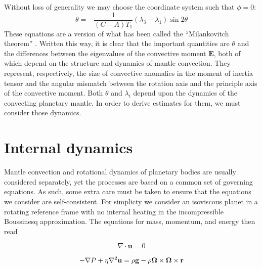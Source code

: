 \documentclass[extra,mreferee]{gji}
\begin{document}
Without loss of generality we may choose the coordinate system such that $\phi=0$:
\begin{equation}
\dot{\theta} = - \frac{1}{(C-A)T_1} (\lambda_3-\lambda_1) \sin{2 \theta}
\label{eq:simple_milankovitch}
\end{equation}
These equations are a version of what has been called the ``Milankovitch theorem'' \citep{munk1960rotation}.  
Written this way, it is clear that the important quantities are $\theta$ and the differences between the eigenvalues of the convective moment $\mathbf{E}$, both of which depend on the structure and dynamics of mantle convection.  
They represent, respectively, the size of convective anomalies in the moment of inertia tensor and the angular mismatch between the rotation axis and the principle axis of the convective moment.
Both $\theta$ and $\lambda_i$ depend upon the dynamics of the convecting planetary mantle.
In order to derive estimates for them, we must consider those dynamics.

\section{Internal dynamics}
\label{sec:internal}

Mantle convection and rotational dynamics of planetary bodies are usually considered separately, yet the processes are based on a common set of governing equations. 
As such, some extra care must be taken to ensure that the equations we consider are self-consistent. 
For simplicty we consider an isoviscous planet in a rotating reference frame with no internal heating in the incompressible Boussinesq approximation.  The equations for mass, momentum, and energy then read

\begin{equation}
\nabla \cdot \mathbf{u} = 0
\label{eq:conserve_mass}
\end{equation}

\begin{equation}
\begin{aligned}
- \nabla P + \eta \nabla^2 \mathbf{u} =  \rho \mathbf{g} -  \rho \mitbf{\Omega} \times \mitbf{\Omega} \times \mathbf{r}
\label{eq:navier_stokes}
\end{aligned}
\end{equation}
\end{document}
